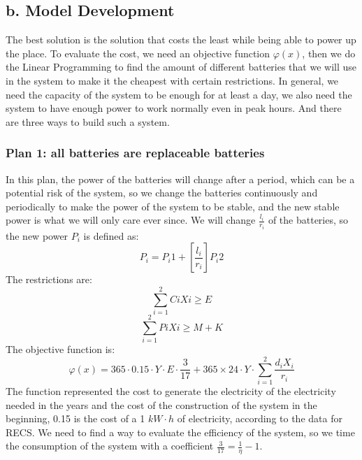 \documentclass{article}
\begin{document}
\subsection{b. Model Development}
The best solution is the solution that costs the least while being able to power up the place. To evaluate the cost, we need an objective function $\varphi (x)$, then we do the Linear Programming
to find the amount of different batteries that we will use in the system to make it the cheapest with certain restrictions. In general, we need the  capacity of the system to be enough for
at least a day, we also need the system to have enough power to work normally even in peak hours.
And there are three ways to build such a system.
\subsubsection{Plan 1: all batteries are replaceable batteries}
In this plan, the power of the batteries will change after a period, which can be a potential risk of the system, so we change the batteries continuously and periodically to make
the power of the system to be stable, and the new stable power is what we will only care ever since. We will change $\frac{l_i}{r_i}$ of the batteries, so the new power $P_i$ is  defined
as:$$P_i=P_i1+[\frac{l_i}{r_i}]P_i2$$
The restrictions are:
$$\sum_{i=1}^2CiXi\geq E$$
$$\sum_{i=1}^2PiXi\geq M+K$$
The objective function is:
$$\varphi (x)=365 \cdot 0.15 \cdot Y \cdot E \cdot \frac{3}{17} +365\times 24\cdot Y \cdot \sum_{i=1} ^2\frac{d_iX_i}{r_i}$$
The function represented the cost to generate the electricity of the electricity needed in the years and the cost of the construction of the system in the beginning, 0.15 is the cost of a 1 $kW\cdot h$ of electricity,
according to the data for RECS. We need to find a way to evaluate the efficiency of the system, so we time the consumption of the system with a coefficient $\frac{3}{17}=\frac{1}{\eta }-1$.
\end{document}
